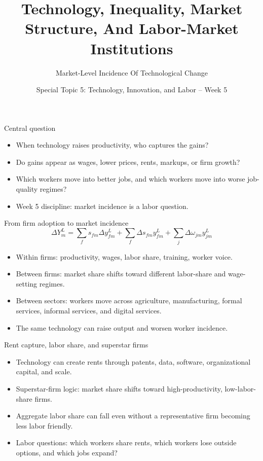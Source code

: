 \documentclass[aspectratio=169,11pt]{beamer}
\title{Technology, Inequality, Market Structure, And Labor-Market Institutions}
\subtitle{Market-Level Incidence Of Technological Change}
\author{Special Topic 5: Technology, Innovation, and Labor -- Week 5}
\date{}
\begin{document}
\begin{frame}
  \titlepage
\end{frame}

\begin{frame}{Central question}
\begin{itemize}
    \item When technology raises productivity, who captures the gains?
    \item Do gains appear as wages, lower prices, rents, markups, or firm growth?
    \item Which workers move into better jobs, and which workers move into worse job-quality regimes?
    \item Week 5 discipline: market incidence is a labor question.
\end{itemize}
\end{frame}

\begin{frame}{From firm adoption to market incidence}
\small
\[
\Delta Y^{L}_{m}
=
\sum_f s_{fm}\Delta y^{L}_{fm}
+
\sum_f \Delta s_{fm}y^{L}_{fm}
+
\sum_j \Delta \omega_{jm}y^{L}_{jm}
\]
\begin{itemize}
    \item Within firms: productivity, wages, labor share, training, worker voice.
    \item Between firms: market share shifts toward different labor-share and wage-setting regimes.
    \item Between sectors: workers move across agriculture, manufacturing, formal services, informal services, and digital services.
    \item The same technology can raise output and worsen worker incidence.
\end{itemize}
\end{frame}

\begin{frame}{Rent capture, labor share, and superstar firms}
\begin{itemize}
    \item Technology can create rents through patents, data, software, organizational capital, and scale.
    \item Superstar-firm logic: market share shifts toward high-productivity, low-labor-share firms.
    \item Aggregate labor share can fall even without a representative firm becoming less labor friendly.
    \item Labor questions: which workers share rents, which workers lose outside options, and which jobs expand?
\end{itemize}
\end{frame}
\end{document}
